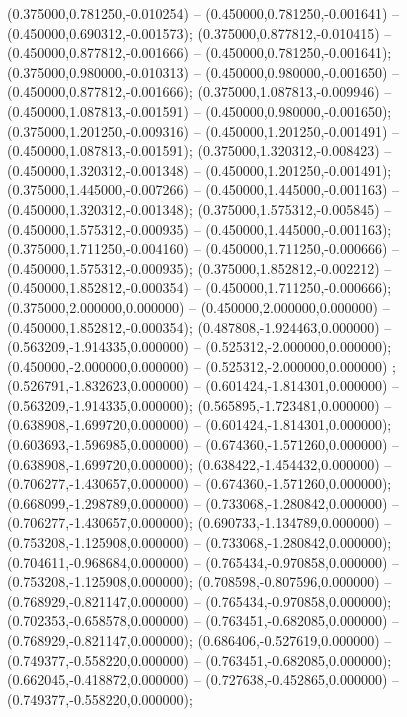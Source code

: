  (0.375000,0.781250,-0.010254) -- (0.450000,0.781250,-0.001641) -- (0.450000,0.690312,-0.001573);
 (0.375000,0.877812,-0.010415) -- (0.450000,0.877812,-0.001666) -- (0.450000,0.781250,-0.001641);
 (0.375000,0.980000,-0.010313) -- (0.450000,0.980000,-0.001650) -- (0.450000,0.877812,-0.001666);
 (0.375000,1.087813,-0.009946) -- (0.450000,1.087813,-0.001591) -- (0.450000,0.980000,-0.001650);
 (0.375000,1.201250,-0.009316) -- (0.450000,1.201250,-0.001491) -- (0.450000,1.087813,-0.001591);
 (0.375000,1.320312,-0.008423) -- (0.450000,1.320312,-0.001348) -- (0.450000,1.201250,-0.001491);
 (0.375000,1.445000,-0.007266) -- (0.450000,1.445000,-0.001163) -- (0.450000,1.320312,-0.001348);
 (0.375000,1.575312,-0.005845) -- (0.450000,1.575312,-0.000935) -- (0.450000,1.445000,-0.001163);
 (0.375000,1.711250,-0.004160) -- (0.450000,1.711250,-0.000666) -- (0.450000,1.575312,-0.000935);
 (0.375000,1.852812,-0.002212) -- (0.450000,1.852812,-0.000354) -- (0.450000,1.711250,-0.000666);
 (0.375000,2.000000,0.000000) -- (0.450000,2.000000,0.000000) -- (0.450000,1.852812,-0.000354);
 (0.487808,-1.924463,0.000000) -- (0.563209,-1.914335,0.000000) -- (0.525312,-2.000000,0.000000);
 (0.450000,-2.000000,0.000000) -- (0.525312,-2.000000,0.000000) ;
 (0.526791,-1.832623,0.000000) -- (0.601424,-1.814301,0.000000) -- (0.563209,-1.914335,0.000000);
 (0.565895,-1.723481,0.000000) -- (0.638908,-1.699720,0.000000) -- (0.601424,-1.814301,0.000000);
 (0.603693,-1.596985,0.000000) -- (0.674360,-1.571260,0.000000) -- (0.638908,-1.699720,0.000000);
 (0.638422,-1.454432,0.000000) -- (0.706277,-1.430657,0.000000) -- (0.674360,-1.571260,0.000000);
 (0.668099,-1.298789,0.000000) -- (0.733068,-1.280842,0.000000) -- (0.706277,-1.430657,0.000000);
 (0.690733,-1.134789,0.000000) -- (0.753208,-1.125908,0.000000) -- (0.733068,-1.280842,0.000000);
 (0.704611,-0.968684,0.000000) -- (0.765434,-0.970858,0.000000) -- (0.753208,-1.125908,0.000000);
 (0.708598,-0.807596,0.000000) -- (0.768929,-0.821147,0.000000) -- (0.765434,-0.970858,0.000000);
 (0.702353,-0.658578,0.000000) -- (0.763451,-0.682085,0.000000) -- (0.768929,-0.821147,0.000000);
 (0.686406,-0.527619,0.000000) -- (0.749377,-0.558220,0.000000) -- (0.763451,-0.682085,0.000000);
 (0.662045,-0.418872,0.000000) -- (0.727638,-0.452865,0.000000) -- (0.749377,-0.558220,0.000000);
